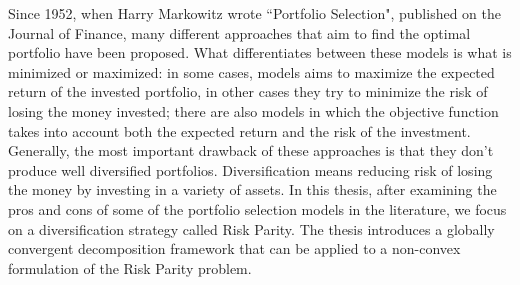 Since 1952, when Harry Markowitz wrote “Portfolio Selection", published on the Journal of Finance, many different approaches that aim to find the optimal portfolio have been proposed. What differentiates between these models is what is minimized or maximized: in some cases, models aims to maximize the expected return of the invested portfolio, in other cases they try to minimize the risk of losing the money invested; there are also models in which the objective function takes into account both the expected return and the risk of the investment. Generally, the most important drawback of these approaches is that they don't produce well diversified portfolios. Diversification means reducing risk of losing the money by investing in a variety of assets. In this thesis, after examining the pros and cons of some of the portfolio selection models in the literature, we focus on a diversification strategy called Risk Parity. The thesis introduces a globally convergent decomposition framework that can be applied to a non-convex formulation of the Risk Parity problem.